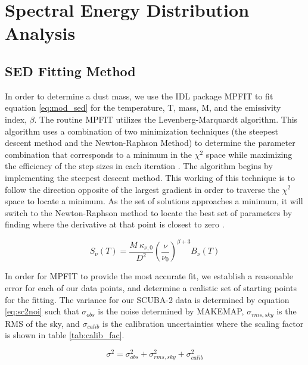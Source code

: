 \chapter{Spectral Energy Distribution Analysis}

\section{SED Fitting Method}

In order to determine a dust mass, we use the IDL package MPFIT \citep{markwardt2009} to fit equation \ref{eq:mod_sed} for the temperature, T, mass, M, and the emissivity index, $\beta$.  The routine MPFIT utilizes the Levenberg-Marquardt algorithm.  This algorithm uses a combination of two minimization techniques (the steepest descent method and the Newton-Raphson Method) to determine the parameter combination that corresponds to a minimum in the $\chi^2$ space while maximizing the efficiency of the step sizes in each iteration \citep{burden2001}.  The algorithm begins by implementing the steepest descent method.  This working of this technique is to follow the direction opposite of the largest gradient in order to traverse the $\chi^2$ space to locate a minimum.  As the set of solutions approaches a minimum, it will switch to the Newton-Raphson method to locate the best set of parameters by finding where the derivative at that point is closest to zero \citep{gavin2013}.  

\begin{equation}\label{eq:mod_sed}
  S_\nu\left(T\right) = \frac{M\:\kappa_{\nu,0}}{D^2}\left(\frac{\nu}{\nu_0}\right)^{\beta+3} B_\nu\left(T\right)
\end{equation}

In order for MPFIT to provide the most accurate fit, we establish a reasonable error for each of our data points, and determine a realistic set of starting points for the fitting.  The variance for our SCUBA-2 data is determined by equation \ref{eq:sc2noi} such that $\sigma_{obs}$ is the noise determined by MAKEMAP, $\sigma_{rms,sky}$ is the RMS of the sky, and $\sigma_{calib}$ is the calibration uncertainties where the scaling factor is shown in table \ref{tab:calib_fac}.

\begin{equation}\label{eq:sc2noi}
  \sigma^2 = \sigma_{obs}^2 + \sigma_{rms,sky}^2 + \sigma_{calib}^2
\end{equation}

